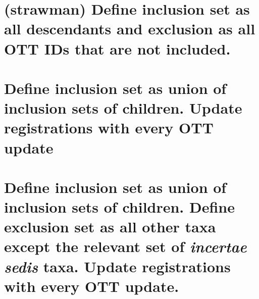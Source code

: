 \documentclass[11pt]{article}
\begin{document}
\section{(strawman) Define inclusion set as all descendants and exclusion as all 
OTT IDs that are not included.}

\section{Define inclusion set as union of inclusion sets of children.
Update registrations with every OTT update}

\section{Define inclusion set as union of inclusion sets of children. Define 
exclusion set as all other taxa except the relevant set of {\em incertae sedis} 
taxa.
Update registrations with every OTT update.}


\end{document}
